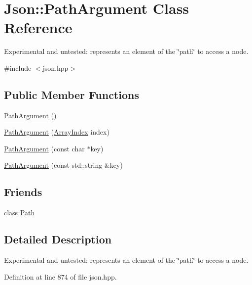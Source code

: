\hypertarget{class_json_1_1_path_argument}{\section{Json\-:\-:Path\-Argument Class Reference}
\label{class_json_1_1_path_argument}
}


Experimental and untested\-: represents an element of the \char`\"{}path\char`\"{} to access a node.  




{\ttfamily \#include $<$json.\-hpp$>$}

\subsection*{Public Member Functions}
\begin{DoxyCompactItemize}
\item 
\hyperlink{class_json_1_1_path_argument_a3c96ed20c56a55eb76d37a11553c528e}{Path\-Argument} ()
\item 
\hyperlink{class_json_1_1_path_argument_a53c5b27143b161301b95fd544c139ecf}{Path\-Argument} (\hyperlink{namespace_json_a8048e741f2177c3b5d9ede4a5b8c53c2}{Array\-Index} index)
\item 
\hyperlink{class_json_1_1_path_argument_a9690417a8a40e6e49f2acdf6c9281345}{Path\-Argument} (const char $\ast$key)
\item 
\hyperlink{class_json_1_1_path_argument_a08f872cfee4fc600f7fa3bcaaff0d41c}{Path\-Argument} (const std\-::string \&key)
\end{DoxyCompactItemize}
\subsection*{Friends}
\begin{DoxyCompactItemize}
\item 
class \hyperlink{class_json_1_1_path_argument_a4877239a6b7f09fbf5a61ca68a49d74c}{Path}
\end{DoxyCompactItemize}


\subsection{Detailed Description}
Experimental and untested\-: represents an element of the \char`\"{}path\char`\"{} to access a node. 

Definition at line 874 of file json.\-hpp.



